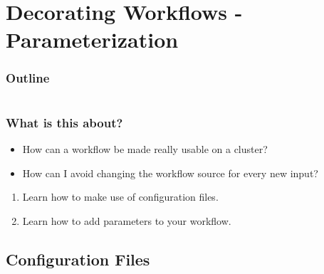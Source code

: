 \section{Decorating Workflows - Parameterization}

\begin{frame}
    \frametitle{Outline}
    \begin{columns}[t]
        \begin{column}{.5\textwidth}
            \tableofcontents[sections={1-7},currentsection]
        \end{column}
        \begin{column}{.5\textwidth}
            \tableofcontents[sections={8-15},currentsection]
        \end{column}
    \end{columns}
\end{frame}

\begin{frame}
  \frametitle{What is this about?}
   \begin{question}[Questions]
   	  \begin{itemize}
         \item How can a workflow be made really usable on a cluster?
         \item How can I avoid changing the workflow source for every new input?
      \end{itemize}
   \end{question}
   \begin{docs}[Objectives]
   	 \begin{enumerate}
                      \item Learn how to make use of configuration files.  
                      \item Learn how to add parameters to your workflow.
     \end{enumerate}
   \end{docs}
\end{frame}

\subsection{Configuration Files}


